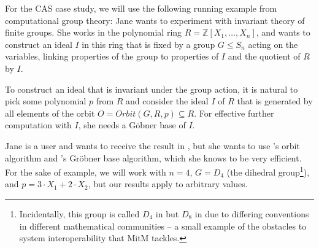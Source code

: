 %

For the CAS case study, we will use the following running example from computational group theory: Jane wants to experiment with invariant theory of finite groups.
She works in the polynomial ring $R=\mathbb{Z}[X_1,\ldots,X_n]$, and wants to construct an ideal $I$ in this ring that is fixed by a group $G \leq S_n$ acting on the variables, linking properties of the group to properties of $I$ and the quotient of $R$ by $I$.

To construct an ideal that is invariant
under the group action, it is natural to pick some polynomial $p$ from $R$
and consider the ideal $I$ of $R$ that is generated by all elements of the orbit
$O=Orbit(G,R,p)\subseteq R$.
For effective further computation with $I$, she needs a G\"obner base of $I$.

Jane is a \Sage user and wants to receive the result in \Sage, but she wants to
use \GAP's orbit algorithm and \Singular's Gr\"obner base algorithm, which she
knows to be very efficient. For the sake of example, we will work with $n=4$,
$G=D_4$ (the dihedral group\footnote{Incidentally, this group is called $D_4$ in
\Sage but $D_8$ in \GAP due to differing conventions in different mathematical
communities -- a small example of the obstacles to system interoperability that
MitM tackles.}), and $p=3\cdot X_1+2\cdot X_2$, but our results apply to
arbitrary values.

